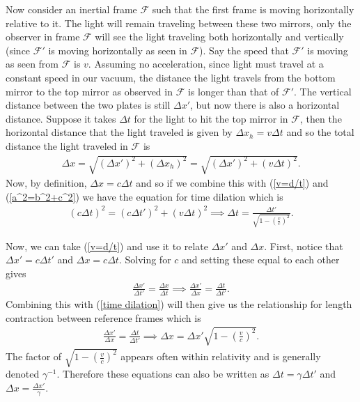 \documentclass[11pt]{article}
\theoremstyle{definition}
\begin{document}
Now consider an inertial frame $\mathcal{F}$ such that the first frame is moving horizontally relative to it. The light will remain traveling between these two mirrors, only the observer in frame $\mathcal{F}$ will see the light traveling both horizontally and vertically (since $\mathcal{F}'$ is moving horizontally as seen in $\mathcal{F}$). Say the speed that $\mathcal{F}'$ is moving as seen from $\mathcal{F}$ is $v$. Assuming no acceleration, since light must travel at a constant speed in our vacuum, the distance the light travels from the bottom mirror to the top mirror as observed in $\mathcal{F}$ is longer than that of $\mathcal{F}'$. The vertical distance between the two plates is still $\Delta x'$, but now there is also a horizontal distance. Suppose it takes $\Delta t$ for the light to hit the top mirror in $\mathcal{F}$, then the horizontal distance that the light traveled is given by $\Delta x_h = v \Delta t$ and so the total distance the light traveled in $\mathcal{F}$ is 
\begin{align}
\Delta x =\sqrt{(\Delta x')^2 + (\Delta x_h)^2}=\sqrt{(\Delta x')^2 + (v \Delta t)^2}. \label{a^2=b^2+c^2}
\end{align}
Now, by definition, $\Delta x = c \Delta t$ and so if we combine this with (\ref{v=d/t}) and (\ref{a^2=b^2+c^2}) we have the equation for time dilation which is
\begin{align}
(c \Delta t)^2=(c \Delta t')^2 + (v \Delta t)^2 \implies \boxed{\Delta t=\frac{\Delta t'}{\sqrt{1-\left(\frac{v}{c}\right)^2}}} \label{time dilation}.
\end{align}

Now, we can take (\ref{v=d/t}) and use it to relate $\Delta x'$ and $\Delta x$. First, notice that $\Delta x' = c \Delta t'$ and $\Delta x = c \Delta t$. Solving for $c$ and setting these equal to each other gives \begin{align}
\frac{\Delta x'}{\Delta t'} = \frac{\Delta x}{\Delta t} \implies \frac{\Delta x'}{\Delta x} = \frac{\Delta t}{\Delta t'} \label{Delta x'/Delta t' = Delta x/Delta t}.
\end{align} 
Combining this with (\ref{time dilation}) will then give us the relationship for length contraction between reference frames which is
\begin{align}
\frac{\Delta x'}{\Delta x} = \frac{\Delta t}{\Delta t'} \implies \Delta x = \boxed{\Delta x' \sqrt{1-\left(\frac{v}{c}\right)^2}}. \label{lengthContraction}
\end{align}
The factor of $\sqrt{1-\left(\frac{v}{c}\right)^2}$ appears often within relativity and is generally denoted $\gamma^{-1}$. Therefore these equations can also be written as $\Delta t=\gamma \Delta t'$ and $\Delta x=\frac{ \Delta x'}{\gamma}$. 
\end{document}
